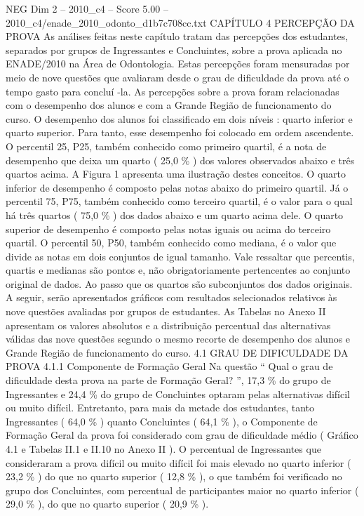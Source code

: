\begin{textsample}{NEG Dim 2 – 2010\_c4 – Score 5.00 – 2010\_c4/enade\_2010\_odonto\_d1b7c708cc.txt}  \label{ex:f2_neg_292}
CAPÍTULO 4 PERCEPÇÃO DA PROVA As análises feitas neste capítulo tratam das percepções dos estudantes, separados por grupos de Ingressantes e Concluintes, sobre a prova aplicada no ENADE/2010 na Área de Odontologia.
Estas percepções foram mensuradas por meio de nove questões que avaliaram desde o grau de dificuldade da prova até o tempo gasto para concluí -la.
As percepções sobre a prova foram relacionadas com o desempenho dos alunos e com a Grande Região de funcionamento do curso.
O desempenho dos alunos foi classificado em dois níveis : quarto inferior e quarto superior.
Para tanto, esse desempenho foi colocado em ordem ascendente.
O percentil 25, P25, também conhecido como primeiro quartil, é a nota de desempenho que deixa um quarto ( 25,0 \% ) dos valores observados abaixo e três quartos acima.
A Figura 1 apresenta uma ilustração destes conceitos.
O quarto inferior de desempenho é composto pelas notas abaixo do primeiro quartil.
Já o percentil 75, P75, também conhecido como terceiro quartil, é o valor para o qual há três quartos ( 75,0 \% ) dos dados abaixo e um quarto acima dele.
O quarto superior de desempenho é composto pelas notas iguais ou acima do terceiro quartil.
O percentil 50, P50, também conhecido como mediana, é o valor que divide as notas em dois conjuntos de igual tamanho.
Vale ressaltar que percentis, quartis e medianas são pontos e, não obrigatoriamente pertencentes ao conjunto original de dados.
Ao passo que os quartos são subconjuntos dos dados originais.
A seguir, serão apresentados gráficos com resultados selecionados relativos às nove questões avaliadas por grupos de estudantes.
As Tabelas no Anexo II apresentam os valores absolutos e a distribuição percentual das alternativas válidas das nove questões segundo o mesmo recorte de desempenho dos alunos e Grande Região de funcionamento do curso. 4.1 GRAU DE DIFICULDADE DA PROVA 4.1.1 Componente de Formação Geral Na questão “ Qual o grau de dificuldade desta prova na parte de Formação Geral? ”, 17,3 \% do grupo de Ingressantes e 24,4 \% do grupo de Concluintes optaram pelas alternativas difícil ou muito difícil.
Entretanto, para mais da metade dos estudantes, tanto Ingressantes ( 64,0 \% ) quanto Concluintes ( 64,1 \% ), o Componente de Formação Geral da prova foi considerado com grau de dificuldade médio ( Gráfico 4.1 e Tabelas II.1 e II.10 no Anexo II ).
O percentual de Ingressantes que consideraram a prova difícil ou muito difícil foi mais elevado no quarto inferior ( 23,2 \% ) do que no quarto superior ( 12,8 \% ), o que também foi verificado no grupo dos Concluintes, com percentual de participantes maior no quarto inferior ( 29,0 \% ), do que no quarto superior ( 20,9 \% ).

\end{textsample}
